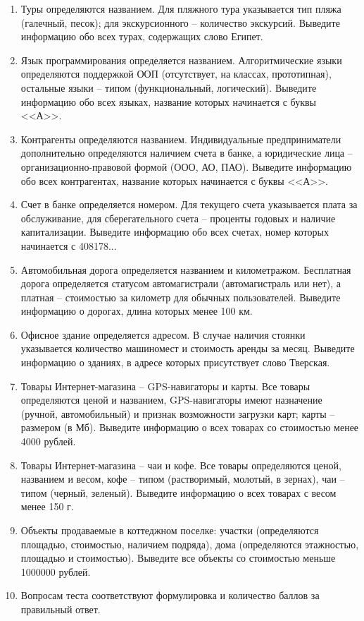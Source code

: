 \begin{enumerate}
\item Туры определяются названием. Для пляжного тура указывается тип пляжа (галечный, песок); для экскурсионного --
количество экскурсий. Выведите информацию обо всех турах, содержащих слово Египет.
\item Язык программирования определяется названием. Алгоритмические языки определяются поддержкой ООП
(отсутствует, на классах, прототипная), остальные языки -- типом (функциональный, логический). 
Выведите информацию обо всех языках, название которых начинается с буквы <<А>>.
\item Контрагенты определяются названием. Индивидуальные предприниматели дополнительно определяются
наличием счета в банке, а юридические лица -- организационно-правовой формой (ООО, АО, ПАО).
Выведите информацию обо всех контрагентах, название которых начинается с буквы <<А>>.
\item Счет в банке определяется номером. Для текущего счета указывается плата за обслуживание, 
для сберегательного счета -- проценты годовых и наличие капитализации.
Выведите информацию обо всех счетах, номер которых начинается с 408178...
\item Автомобильная дорога определяется названием и километражом. Бесплатная дорога определяется статусом автомагистрали
(автомагистраль или нет), а платная -- стоимостью за километр для обычных пользователей. Выведите информацию о дорогах,
длина которых менее 100 км.
\item Офисное здание определяется адресом. В случае наличия стоянки указывается количество машиномест и стоимость
аренды за месяц. Выведите информацию о зданиях, в адресе которых присутствует слово Тверская.
\item Товары Интернет-магазина -- GPS-навигаторы и карты. 
Все товары определяются ценой и названием, GPS-навигаторы имеют назначение (ручной, автомобильный) и признак 
возможности загрузки карт;
карты -- размером (в Мб). Выведите информацию о всех товарах со стоимостью менее 4000 рублей.
\item Товары Интернет-магазина -- чаи и кофе.
Все товары определяются ценой, названием и весом, кофе -- типом (растворимый, молотый, в зернах), чаи -- типом
(черный, зеленый). Выведите информацию о всех товарах с весом менее 150 г.
\item Объекты продаваемые в коттеджном поселке: участки (определяются площадью, стоимостью, наличием подряда), дома 
(определяются этажностью, площадью и стоимостью). Выведите все объекты со стоимостью меньше 1000000 рублей.
\item Вопросам теста соответствуют формулировка и количество баллов за правильный ответ. 

\end{enumerate}
